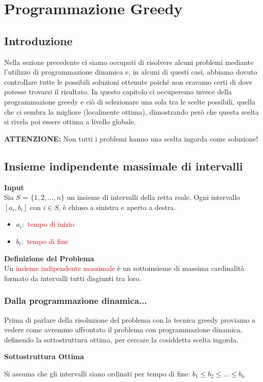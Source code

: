 \documentclass[../cheatSheetAlgoritmi.tex]{subfiles}
\begin{document}
\chapter{Programmazione Greedy}
\section{Introduzione}
Nella sezione precedente ci siamo occupati di risolvere alcuni problemi mediante l'utilizzo di programmazione dinamica e, in alcuni di questi casi, abbiamo dovuto controllare tutte le possibili soluzioni ottenute poiché non eravamo certi di dove potesse trovarsi il risultato. In questo capitolo ci occuperemo invece della programmazione greedy e ciò di selezionare una sola tra le scelte possibili, quella che ci sembra la migliore (localmente ottima), dimostrando però che questa scelta si rivela poi essere ottima a livello globale.

\textbf{ATTENZIONE:} Non tutti i problemi hanno una scelta ingorda come soluzione!
\section{Insieme indipendente massimale di intervalli}
\textbf{Input}\\
Sia $S$ = $\{1, 2, ..., n\}$ un insieme di intervalli della retta reale. Ogni intervallo $[a_i, b_i]$ con $i \in S$, è chiuso a sinistra e aperto a destra.
\begin{itemize}
	\item  $a_i:$ \textcolor{red}{tempo di inizio}
	\item  $b_i:$ \textcolor{red}{tempo di fine}
\end{itemize}
\textbf{Definizione del Problema} \\
Un \textcolor{red}{insieme indipendente massimale} è un sottoinsieme di massima cardinalità formato da intervalli tutti disgiunti tra loro.
\subsection{Dalla programmazione dinamica...}
Prima di parlare della risoluzione del problema con la tecnica greedy proviamo a vedere come avremmo affrontato il problema con programmazione dinamica, definendo la sottostruttura ottima, per cercare la cosiddetta scelta ingorda.

\textbf{Sottostruttura Ottima}

Si assuma che gli intervalli siano ordinati per tempo di fine: $b_1 \leq b_2 \leq ... \leq b_n$
\end{document}
